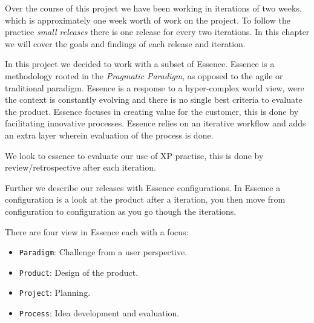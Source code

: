 Over the course of this project we have been working in iterations of two weeks, which is approximately one week worth of work on the project. To follow the practice \textit{small releases} there is one release for every two iterations. In this chapter we will cover the goals and findings of each release and iteration.

In this project we decided to work with a subset of Essence. Essence is a methodology rooted in the \textit{Pragmatic Paradigm}, as opposed to the agile or traditional paradigm. Essence is a response to a hyper-complex world view, were the context is constantly evolving and there is no single best criteria to evaluate the product. Essence focuses in creating value for the customer, this is done by facilitating innovative processes. Essence relies on an iterative workflow and adds an extra layer wherein evaluation of the process is done. 

We look to essence to evaluate our use of XP practise, this is done by review/retrospective after each iteration.

Further we describe our releases with Essence configurations. In Essence a configuration is a look at the product after a iteration, you then move from configuration to configuration as you go though the iterations. 

There are four view in Essence each with a  focus: 
\begin{itemize}
\item \texttt{Paradigm}: Challenge from a user perspective.
\item \texttt{Product}: Design of the product.
\item \texttt{Project}: Planning.
\item \texttt{Process}: Idea development and evaluation.
\end{itemize}



